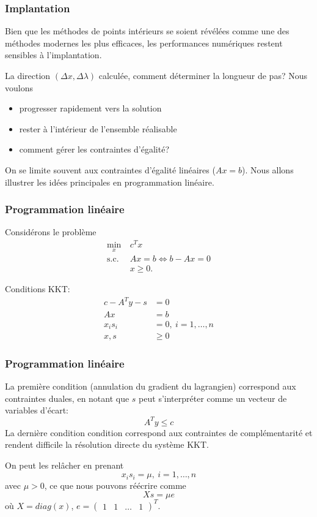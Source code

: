 \documentclass[usepdftitle=false,aspectratio=169]{beamer}
\begin{document}
\begin{frame}
\frametitle{Implantation}

Bien que les méthodes de points intérieurs se soient révélées comme une des méthodes modernes les plus efficaces, les performances numériques restent sensibles à l'implantation.

\mbox{}

La direction $(\Delta x, \Delta \lambda)$ calculée, comment déterminer la longueur de pas? Nous voulons
\begin{itemize}
	\item progresser rapidement vers la solution
	\item rester à l'intérieur de l'ensemble réalisable
	\item comment gérer les contraintes d'égalité?
\end{itemize}

\mbox{}

On se limite souvent aux contraintes d'égalité linéaires ($Ax = b$).
Nous allons illustrer les idées principales en programmation linéaire.

\end{frame}

\begin{frame}
\frametitle{Programmation linéaire}

Considérons le problème
\begin{align*}
\min_x\ & c^Tx \\
\mbox{s.c. } & Ax = b \Leftrightarrow b-Ax = 0\\
& x \geq 0.
\end{align*}

\mbox{}

Conditions KKT:
\begin{align*}
c-A^Ty-s &= 0 \\
Ax &= b \\
x_is_i &= 0, \ i =1,\ldots,n \\
x, s &\geq 0
\end{align*}

\end{frame}

\begin{frame}
\frametitle{Programmation linéaire}

La première condition (annulation du gradient du lagrangien) correspond aux contraintes duales, en notant que $s$ peut s'interpréter comme un vecteur de variables d'écart:
$$
A^Ty \leq c
$$
La dernière condition condition correspond aux contraintes de complémentarité et rendent difficile la résolution directe du système KKT.

\mbox{}

On peut les relâcher en prenant
$$
x_is_i = \mu, \ i =1,\ldots,n
$$
avec $\mu > 0$, ce que nous pouvons réécrire comme
$$
Xs = \mu e
$$
où $X = diag(x)$, $e = \begin{pmatrix} 1 & 1 & \ldots & 1 \end{pmatrix}^T$.

\end{frame}
\end{document}
